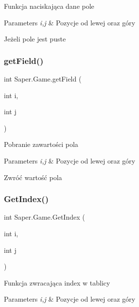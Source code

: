 Funkcja naciskająca dane pole 
\begin{DoxyParams}{Parameters}
{\em i,j} & Pozycje od lewej oraz góry \\
\hline
\end{DoxyParams}
Jeżeli pole jest puste \mbox{\label{class_saper_1_1_game_a6ad3e962eca53c2dbf6b499a469fa5f2}} 
\subsubsection{\texorpdfstring{getField()}{getField()}}
{\footnotesize\ttfamily int Saper.\+Game.\+get\+Field (\begin{DoxyParamCaption}\item[{int}]{i,  }\item[{int}]{j }\end{DoxyParamCaption})}

Pobranie zawartości pola 
\begin{DoxyParams}{Parameters}
{\em i,j} & Pozycje od lewej oraz góry \\
\hline
\end{DoxyParams}
Zwróć wartość pola \mbox{\label{class_saper_1_1_game_a036a73f7d4b60dada7ec45c9a712eff4}} 
\subsubsection{\texorpdfstring{GetIndex()}{GetIndex()}}
{\footnotesize\ttfamily int Saper.\+Game.\+Get\+Index (\begin{DoxyParamCaption}\item[{int}]{i,  }\item[{int}]{j }\end{DoxyParamCaption})}

Funkcja zwracająca index w tablicy 
\begin{DoxyParams}{Parameters}
{\em i,j} & Pozycje od lewej oraz góry \\
\hline
\end{DoxyParams}
\mbox{\label{class_saper_1_1_game_aad59b3c8d1d9ca582a9b508aad99631a}} 
